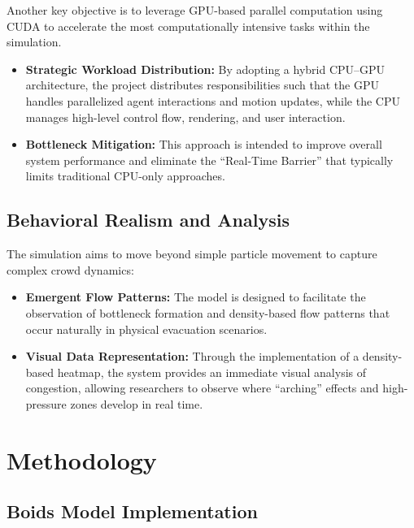 \documentclass[12pt,a4paper]{report}
\begin{document}
Another key objective is to leverage GPU-based parallel computation using CUDA to accelerate the most computationally intensive tasks within the simulation.

\begin{itemize}
    \item \textbf{Strategic Workload Distribution:} By adopting a hybrid CPU--GPU architecture, the project distributes responsibilities such that the GPU handles parallelized agent interactions and motion updates, while the CPU manages high-level control flow, rendering, and user interaction.
    
    \item \textbf{Bottleneck Mitigation:} This approach is intended to improve overall system performance and eliminate the ``Real-Time Barrier'' that typically limits traditional CPU-only approaches.
\end{itemize}

\section{Behavioral Realism and Analysis}

The simulation aims to move beyond simple particle movement to capture complex crowd dynamics:

\begin{itemize}
    \item \textbf{Emergent Flow Patterns:} The model is designed to facilitate the observation of bottleneck formation and density-based flow patterns that occur naturally in physical evacuation scenarios.
    
    \item \textbf{Visual Data Representation:} Through the implementation of a density-based heatmap, the system provides an immediate visual analysis of congestion, allowing researchers to observe where ``arching'' effects and high-pressure zones develop in real time.
\end{itemize}

\chapter{Methodology}

\section{Boids Model Implementation}
\end{document}
